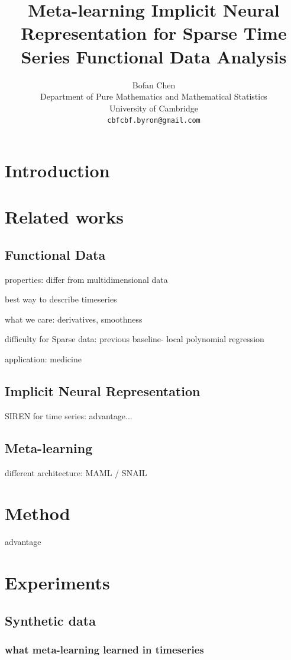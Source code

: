 \documentclass{article}
\title{Meta-learning Implicit Neural Representation for Sparse Time Series Functional Data Analysis}
\author{%
  Bofan Chen\\
  Department of Pure Mathematics and Mathematical Statistics\\
  University of Cambridge\\
  \texttt{cbfcbf.byron@gmail.com} \\}
\begin{document}
\maketitle

\section{Introduction}

\section{Related works}

\subsection{Functional Data}

properties: differ from multidimensional data

best way to describe timeseries


what we care: derivatives, smoothness

difficulty for Sparse data: previous baseline- local polynomial regression

application: medicine

\subsection{Implicit Neural Representation}
SIREN for time series: advantage...

\subsection{Meta-learning}
different architecture: MAML / SNAIL

\section{Method}
advantage
\section{Experiments}

\subsection{Synthetic data}

\subsubsection{what meta-learning learned in  timeseries}
\end{document}

